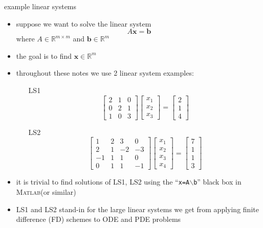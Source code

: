 \documentclass[10pt,hyperref]{beamer}
\newcommand{\bb}{\mathbf{b}}
\newcommand{\bx}{\mathbf{x}}
\newcommand{\RR}{\mathbb{R}}
\newcommand{\Matlab}{\textsc{Matlab}\xspace}
\begin{document}
\begin{frame}{example linear systems}

\begin{itemize}
\item suppose we want to solve the linear system
\begin{equation}
A \bx = \bb \label{introsystem}
\end{equation}
where $A\in \RR^{m\times m}$ and $\bb\in \RR^m$
\item the goal is to find $\bx\in \RR^m$
\item  throughout these notes we use 2 linear system examples:
  \begin{itemize}
  \item[LS1] 
\begin{equation*}
\begin{bmatrix} 2 & 1 & 0 \\
                0 & 2 & 1 \\
                1 & 0 & 3 \end{bmatrix}
\begin{bmatrix} x_1 \\ x_2 \\ x_3 \end{bmatrix}
=
\begin{bmatrix} 2 \\ 1 \\ 4 \end{bmatrix}
\end{equation*}
  \item[LS2]
\begin{equation*}
\begin{bmatrix} 1 & 2 & 3 & 0 \\
                2 & 1 &-2 &-3 \\
               -1 & 1 & 1 & 0 \\
                0 & 1 & 1 &-1 \end{bmatrix}
\begin{bmatrix} x_1 \\ x_2 \\ x_3 \\ x_4 \end{bmatrix}
=
\begin{bmatrix} 7 \\ 1 \\ 1 \\ 3 \end{bmatrix}
\end{equation*}
  \end{itemize}
\item it is trivial to find solutions of LS1, LS2 using the ``\texttt{x=A$\backslash$b}'' black box in \Matlab (or similar)
\item LS1 and LS2 stand-in for the large linear systems we get from applying finite difference (FD) schemes to ODE and PDE problems
\end{itemize}
\end{frame}
\end{document}
